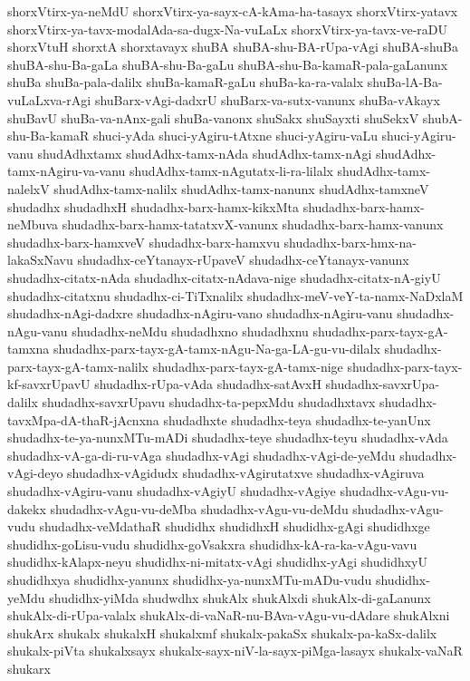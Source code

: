 {shorxVtirx-ya-neMdU
shorxVtirx-ya-sayx-cA-kAma-ha-tasayx
shorxVtirx-yatavx
shorxVtirx-ya-tavx-modalAda-sa-dugx-Na-vuLaLx
shorxVtirx-ya-tavx-ve-raDU
shorxVtuH
shorxtA
shorxtavayx
shuBA
shuBA-shu-BA-rUpa-vAgi
shuBA-shuBa
shuBA-shu-Ba-gaLa
shuBA-shu-Ba-gaLu
shuBA-shu-Ba-kamaR-pala-gaLanunx
shuBa
shuBa-pala-dalilx
shuBa-kamaR-gaLu
shuBa-ka-ra-valalx
shuBa-lA-Ba-vuLaLxva-rAgi
shuBarx-vAgi-dadxrU
shuBarx-va-sutx-vanunx
shuBa-vAkayx
shuBavU
shuBa-va-nAnx-gali
shuBa-vanonx
shuSakx
shuSayxti
shuSekxV
shubA-shu-Ba-kamaR
shuci-yAda
shuci-yAgiru-tAtxne
shuci-yAgiru-vaLu
shuci-yAgiru-vanu
shudAdhxtamx
shudAdhx-tamx-nAda
shudAdhx-tamx-nAgi
shudAdhx-tamx-nAgiru-va-vanu
shudAdhx-tamx-nAgutatx-li-ra-lilalx
shudAdhx-tamx-nalelxV
shudAdhx-tamx-nalilx
shudAdhx-tamx-nanunx
shudAdhx-tamxneV
shudadhx
shudadhxH
shudadhx-barx-hamx-kikxMta
shudadhx-barx-hamx-neMbuva
shudadhx-barx-hamx-tatatxvX-vanunx
shudadhx-barx-hamx-vanunx
shudadhx-barx-hamxveV
shudadhx-barx-hamxvu
shudadhx-barx-hmx-na-lakaSxNavu
shudadhx-ceYtanayx-rUpaveV
shudadhx-ceYtanayx-vanunx
shudadhx-citatx-nAda
shudadhx-citatx-nAdava-nige
shudadhx-citatx-nA-giyU
shudadhx-citatxnu
shudadhx-ci-TiTxnalilx
shudadhx-meV-veY-ta-namx-NaDxlaM
shudadhx-nAgi-dadxre
shudadhx-nAgiru-vano
shudadhx-nAgiru-vanu
shudadhx-nAgu-vanu
shudadhx-neMdu
shudadhxno
shudadhxnu
shudadhx-parx-tayx-gA-tamxna
shudadhx-parx-tayx-gA-tamx-nAgu-Na-ga-LA-gu-vu-dilalx
shudadhx-parx-tayx-gA-tamx-nalilx
shudadhx-parx-tayx-gA-tamx-nige
shudadhx-parx-tayx-kf-savxrUpavU
shudadhx-rUpa-vAda
shudadhx-satAvxH
shudadhx-savxrUpa-dalilx
shudadhx-savxrUpavu
shudadhx-ta-pepxMdu
shudadhxtavx
shudadhx-tavxMpa-dA-thaR-jAcnxna
shudadhxte
shudadhx-teya
shudadhx-te-yanUnx
shudadhx-te-ya-nunxMTu-mADi
shudadhx-teye
shudadhx-teyu
shudadhx-vAda
shudadhx-vA-ga-di-ru-vAga
shudadhx-vAgi
shudadhx-vAgi-de-yeMdu
shudadhx-vAgi-deyo
shudadhx-vAgidudx
shudadhx-vAgirutatxve
shudadhx-vAgiruva
shudadhx-vAgiru-vanu
shudadhx-vAgiyU
shudadhx-vAgiye
shudadhx-vAgu-vu-dakekx
shudadhx-vAgu-vu-deMba
shudadhx-vAgu-vu-deMdu
shudadhx-vAgu-vudu
shudadhx-veMdathaR
shudidhx
shudidhxH
shudidhx-gAgi
shudidhxge
shudidhx-goLisu-vudu
shudidhx-goVsakxra
shudidhx-kA-ra-ka-vAgu-vavu
shudidhx-kAlapx-neyu
shudidhx-ni-mitatx-vAgi
shudidhx-yAgi
shudidhxyU
shudidhxya
shudidhx-yanunx
shudidhx-ya-nunxMTu-mADu-vudu
shudidhx-yeMdu
shudidhx-yiMda
shudwdhx
shukAlx
shukAlxdi
shukAlx-di-gaLanunx
shukAlx-di-rUpa-valalx
shukAlx-di-vaNaR-nu-BAva-vAgu-vu-dAdare
shukAlxni
shukArx
shukalx
shukalxH
shukalxmf
shukalx-pakaSx
shukalx-pa-kaSx-dalilx
shukalx-piVta
shukalxsayx
shukalx-sayx-niV-la-sayx-piMga-lasayx
shukalx-vaNaR
shukarx
}

